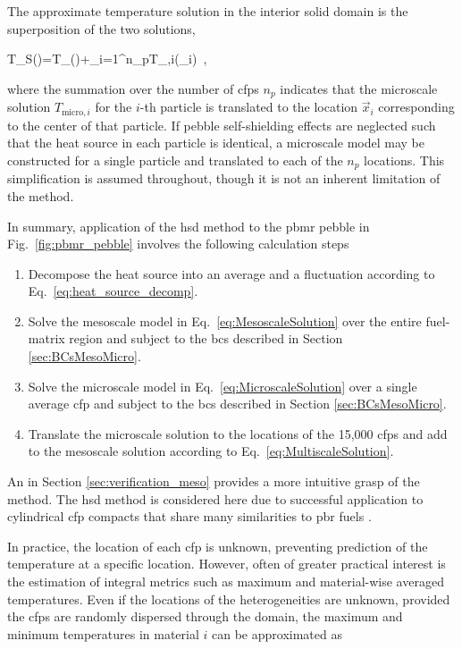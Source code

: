 The approximate temperature solution in the interior solid domain is the superposition of the two solutions,

\beq
\label{eq:MultiscaleSolution}
T_S()=T_()+\sum_{i=1}^{n_p}T_{,i}(_i)\ ,
\eeq

\noindent where the summation over the number of \glspl{cfp} \(n_p\) indicates that the microscale solution \(T_{\text{micro},i}\) for the \(i\)-th particle is translated to the location \(\vec{x}_i\) corresponding to the center of that particle. If pebble self-shielding effects are neglected such that the heat source in each particle is identical, a microscale model may be constructed for a single particle and translated to each of the \(n_p\) locations. This simplification is assumed throughout, though it is not an inherent limitation of the method. 

In summary, application of the \gls{hsd} method to the \gls{pbmr} pebble in Fig.\ \ref{fig:pbmr_pebble} involves the following calculation steps\mdash 

\begin{enumerate}
\itemsep0.3em
\item Decompose the heat source into an average and a fluctuation according to Eq.\ \eqref{eq:heat_source_decomp}.
\item Solve the mesoscale model in Eq.\ \eqref{eq:MesoscaleSolution} over the entire fuel-matrix region and subject to the \glspl{bc} described in Section \ref{sec:BCsMesoMicro}.
\item Solve the microscale model in Eq.\ \eqref{eq:MicroscaleSolution} over a single average \gls{cfp} and subject to the \glspl{bc} described in Section \ref{sec:BCsMesoMicro}.
\item Translate the microscale solution to the locations of the 15,000 \glspl{cfp} and add to the mesoscale solution according to Eq.\ \eqref{eq:MultiscaleSolution}.
\end{enumerate}

An in Section \ref{sec:verification_meso} provides a more intuitive grasp of the method. The \gls{hsd} method is considered here due to successful application to cylindrical \gls{cfp} compacts that share many similarities to \gls{pbr} fuels \cite{stainsby}.

In practice, the location of each \gls{cfp} is unknown, preventing prediction of the temperature at a specific location. However, often of greater practical interest is the estimation of integral metrics such as maximum and material-wise averaged temperatures. Even if the locations of the heterogeneities are unknown, provided the \glspl{cfp} are randomly dispersed through the domain, the maximum and minimum temperatures in material \(i\) can be approximated as

